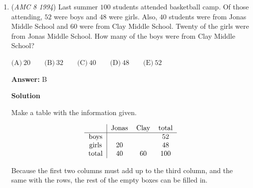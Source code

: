 \begin{enumerate}
 $\text{(A)}\ 7 \qquad \text{(B)}\ 8 \qquad \text{(C)}\ 9 \qquad \text{(D)}\ 10 \qquad \text{(E)}\ 12$

 \textbf{Answer: }A



\textbf{Solution}

We should list all the positive divisors of $36$ and count them. By trial and error, the divisors of $36$ are found to be $1,2,3,4,6,9,12,18,36$, for a total of $9$. However, $1$ and $2$ can't be equal to $N+2$ for a POSITIVE integer N, so the number of possibilities is $\boxed{\text{(A)}\ 7}$.

 



\textbf{Solution 2}

To find the number of positive divisors of $36$, first prime factorize $36$ to get $2^2*3^2$. Then add $1$ to the power of both $2$ and $3$ to get $3$. Multiply $3*3$ to get $9$. Since the problem is asking only for positive integer values of N, subtract $2$ from $9$ (since $2-2$ and $1-2$ result in integers that are not positive) to get $\boxed{\text{(A)}\ 7}$.

 


	\item (\textit{AMC 8 1994}) Last summer $100$ students attended basketball camp.  Of those attending, $52$ were boys and $48$ were girls.  Also, $40$ students were from Jonas Middle School and $60$ were from Clay Middle School.  Twenty of the girls were from Jonas Middle School.  How many of the boys were from Clay Middle School?


 $\text{(A)}\ 20 \qquad \text{(B)}\ 32 \qquad \text{(C)}\ 40 \qquad \text{(D)}\ 48 \qquad \text{(E)}\ 52$

 \textbf{Answer: }B



\textbf{Solution}

Make a table with the information given.

 
 \[\begin{tabular}{c|ccc} & \text{Jonas} & \text{Clay} & \text{total} \\ \hline \text{boys} & & & 52 \\ \text{girls} & 20 & & 48 \\ \text{total} & 40 & 60 & 100  \end{tabular}\]

 Because the first two columns must add up to the third column, and the same with the rows, the rest of the empty boxes can be filled in.


\end{enumerate}
